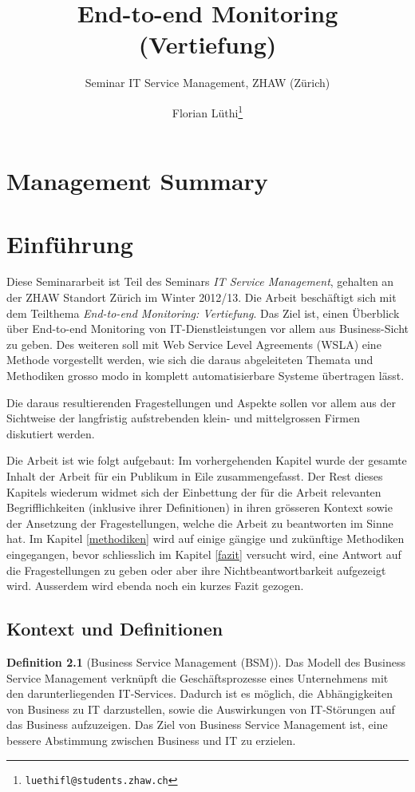 \documentclass[11pt,listof=totoc]{scrreprt} %
\title{End-to-end Monitoring (Vertiefung)}
\subtitle{Seminar IT Service Management, ZHAW (Zürich)}
\author{Florian Lüthi\footnote{\tt luethifl@students.zhaw.ch}}
\theoremstyle{definition}
\newtheorem{definition}{Definition}
\begin{document}
\maketitle

\tableofcontents

\chapter{Management Summary}

\chapter{Einführung}

Diese Seminararbeit ist Teil des Seminars {\em IT Service Management}, gehalten an der ZHAW Standort Zürich im Winter 2012/13. Die Arbeit beschäftigt sich mit dem Teilthema {\em End-to-end Monitoring: Vertiefung}. Das Ziel  ist, einen Überblick über End-to-end Monitoring von IT-Dienstleistungen vor allem aus Business-Sicht zu geben. Des weiteren soll mit Web Service Level Agreements (WSLA) eine Methode vorgestellt werden, wie sich die daraus abgeleiteten Themata und Methodiken grosso modo in komplett automatisierbare Systeme übertragen lässt.

Die daraus resultierenden Fragestellungen und Aspekte sollen vor allem aus der Sichtweise der langfristig aufstrebenden klein- und mittelgrossen Firmen diskutiert werden.

Die Arbeit ist wie folgt aufgebaut: Im vorhergehenden Kapitel wurde der gesamte Inhalt der Arbeit für ein Publikum in Eile zusammengefasst. Der Rest dieses Kapitels wiederum widmet sich der Einbettung der für die Arbeit relevanten Begrifflichkeiten (inklusive ihrer Definitionen) in ihren grösseren Kontext sowie der Ansetzung der Fragestellungen, welche die Arbeit zu beantworten im Sinne hat. Im Kapitel \ref{methodiken} wird auf einige gängige und zukünftige Methodiken eingegangen, bevor schliesslich im Kapitel \ref{fazit} versucht wird, eine Antwort auf die Fragestellungen zu geben oder aber ihre Nichtbeantwortbarkeit aufgezeigt wird. Ausserdem wird ebenda noch ein kurzes Fazit gezogen.

\section{Kontext und Definitionen}

\begin{definition}[Business Service Management (BSM)]
Das Modell des Business Service Management verknüpft die Geschäftsprozesse eines Unternehmens mit den darunterliegenden IT-Services. Dadurch ist es möglich, die Abhängigkeiten von Business zu IT darzustellen, sowie die Auswirkungen von IT-Störungen auf das Business aufzuzeigen. Das Ziel von Business Service Management ist, eine bessere Abstimmung zwischen Business und IT zu erzielen. \cite{wiki:bsm}
\end{definition}
\end{document}
